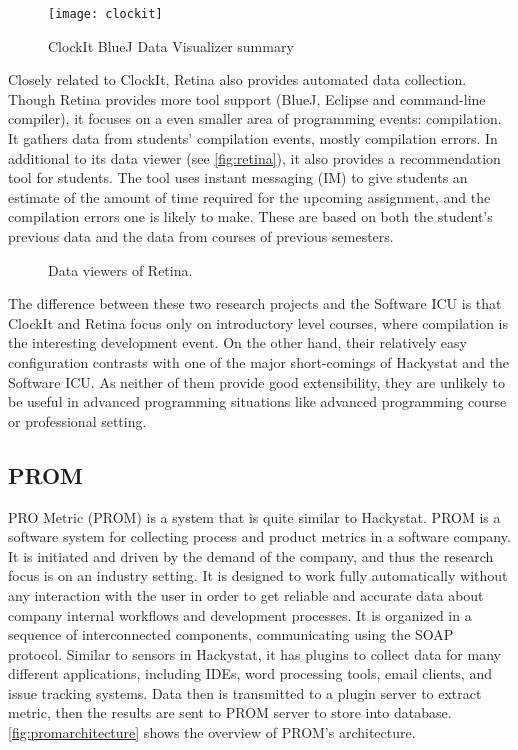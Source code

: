 \begin{figure}[htbp] %
   \centering
   \texttt{[image: clockit]} 
   \caption{ClockIt BlueJ Data Visualizer summary}
   \label{fig:clockit}
\end{figure}

Closely related to ClockIt, Retina also provides automated data collection. Though Retina provides more tool support (BlueJ, Eclipse and command-line compiler), it focuses on a even smaller area of programming events: compilation. It gathers data from students' compilation events, mostly compilation errors. In additional to its data viewer (see \autoref{fig:retina}), it also provides a recommendation tool for students. The tool uses instant messaging (IM) to give students an estimate of the amount of time required for the upcoming assignment, and the compilation errors one is likely to make. These are based on both the student's previous data and the data from courses of previous semesters. 

\begin{figure}[htbp]
     \centering
          
     \caption{Data viewers of Retina.}
     \label{fig:retina}
\end{figure}

The difference between these two research projects and the Software ICU is that ClockIt and Retina focus only on introductory level courses, where compilation is the interesting development event. On the other hand, their relatively easy configuration contrasts with one of the major short-comings of Hackystat and the Software ICU. As neither of them provide good extensibility, they are unlikely to be useful in advanced programming situations like advanced programming course or professional setting.

\subsection {PROM}
PRO Metric (PROM) \cite{prom03} is a system that is quite similar to Hackystat. PROM is a software system for collecting process and product metrics in a software company. It is initiated and driven by the demand of the company, and thus the research focus is on an industry setting. It is designed to work fully automatically without any interaction with the user in order to get reliable and accurate data about company internal workflows and development processes. It is organized in a sequence of interconnected components, communicating using the SOAP protocol. Similar to sensors in Hackystat, it has plugins to collect data for many different applications, including IDEs, word processing tools, email clients, and issue tracking systems. Data then is transmitted to a plugin server to extract metric, then the results are sent to PROM server to store into database. \autoref{fig:promarchitecture} shows the overview of PROM's architecture.

